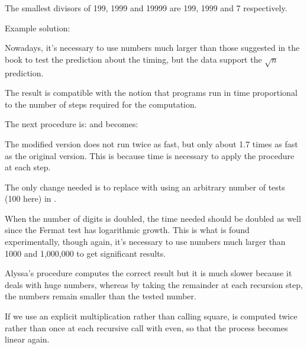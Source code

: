 \begin{exe} %
    The smallest divisors of 199, 1999 and 19999 are 199, 1999 and 
    7 respectively.
\end{exe}

\begin{exe} %
    Example solution:

    Nowadays, it’s necessary to use numbers much larger than those suggested in 
    the book to test the prediction about the timing, but the data support the 
    $\sqrt{n}$ prediction.

    The result is compatible with the notion that programs run in time 
    proportional to the number of steps required for the computation.
\end{exe}

\begin{exe} %
    The next procedure is:
    and  becomes:

    The modified version does not run twice as fast, but only about 1.7 times 
    as fast as the original version. This is because time is necessary to 
    apply the  procedure at each step.
\end{exe}

\begin{exe} %
    The only change needed is to replace  with  
    using an arbitrary number of tests (100 here) in .

    When the number of digits is doubled, the time needed should be doubled as 
    well since the Fermat test has logarithmic growth. This is what is found 
    experimentally, though again, it’s necessary to use numbers much larger 
    than 1000 and 1,000,000 to get significant results.
\end{exe}

\begin{exe} %
    Alyssa’s procedure computes the correct result but it is much slower 
    because it deals with huge numbers, whereas by taking the remainder at 
    each recursion step, the numbers remain smaller than the tested number.
\end{exe}

\begin{exe} %
    If we use an explicit multiplication rather than calling square, 
     is computed twice rather than once at 
    each recursive call with  even, so that the process becomes 
    linear again.
\end{exe}

